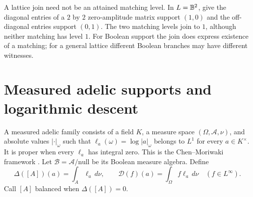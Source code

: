 A lattice join need not be an attained matching level. In $L=\mathbb B^2$, give
the diagonal entries of a $2$ by $2$ zero-amplitude matrix support $(1,0)$
and the off-diagonal entries support $(0,1)$. The two matching levels join
to $1$, although neither matching has level $1$. For Boolean support the
join does express existence of a matching; for a general lattice different
Boolean branches may have different witnesses.

\section{Measured adelic supports and logarithmic descent}
\label{sec:measured-defects}
A measured adelic family consists of a field $K$, a measure space
$(\Omega,\mathcal A,\nu)$, and absolute values $|\cdot|_\omega$ such that
$\ell_a(\omega)=\log|a|_\omega$ belongs to $L^1$ for every $a\in K^\times$.
It is proper when every $\ell_a$ has integral zero. This is the
Chen--Moriwaki framework \citep[Section 3.1]{ChenMoriwakiAdelic}. Let
$\mathcal B=\mathcal A/\text{null}$ be its Boolean measure algebra.
Define
\[
 \Delta([A])(a)=\int_A\ell_a\,d\nu,\qquad
 \mathcal D(f)(a)=\int_\Omega f\ell_a\,d\nu
 \quad(f\in L^\infty).
\]
Call $[A]$ balanced when $\Delta([A])=0$.

